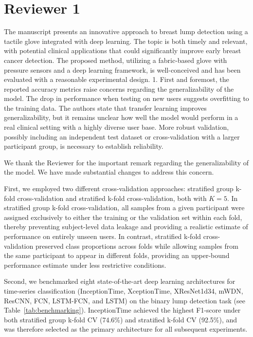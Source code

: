 \documentclass[a4paper, onecolumn]{IEEEtran}
\newcommand\blue[1]{{\textcolor{white!30!blue}{#1}}}
\begin{document}
\section*{Reviewer 1}
\blue{The manuscript presents an innovative approach to breast lump detection using a tactile glove integrated with deep learning. The topic is both timely and relevant, with potential clinical applications that could significantly improve early breast cancer detection. The proposed method, utilizing a fabric-based glove with pressure sensors and a deep learning framework, is well-conceived and has been evaluated with a reasonable experimental design.}
\blue{1. First and foremost, the reported accuracy metrics raise concerns regarding the generalizability of the model. The drop in performance when testing on new users suggests overfitting to the training data. The authors state that transfer learning improves generalizability, but it remains unclear how well the model would perform in a real clinical setting with a highly diverse user base. More robust validation, possibly including an independent test dataset or cross-validation with a larger participant group, is necessary to establish reliability.}

We thank the Reviewer for the important remark regarding the generalizability of the model. We have made substantial changes to address this concern.

First, we employed two different cross-validation approaches: stratified group k-fold cross-validation and stratified k-fold cross-validation, both with $K = 5$. In stratified group k-fold cross-validation, all samples from a given participant were assigned exclusively to either the training or the validation set within each fold, thereby preventing subject-level data leakage and providing a realistic estimate of performance on entirely unseen users. In contrast, stratified k-fold cross-validation preserved class proportions across folds while allowing samples from the same participant to appear in different folds, providing an upper-bound performance estimate under less restrictive conditions.

Second, we benchmarked eight state-of-the-art deep learning architectures for time-series classification (InceptionTime, XceptionTime, XResNet1d34, mWDN, ResCNN, FCN, LSTM-FCN, and LSTM) on the binary lump detection task (see Table~\ref{tab:benchmarking}). InceptionTime achieved the highest F1-score under both stratified group k-fold CV (74.6\%) and stratified k-fold CV (92.5\%), and was therefore selected as the primary architecture for all subsequent experiments.
\end{document}
